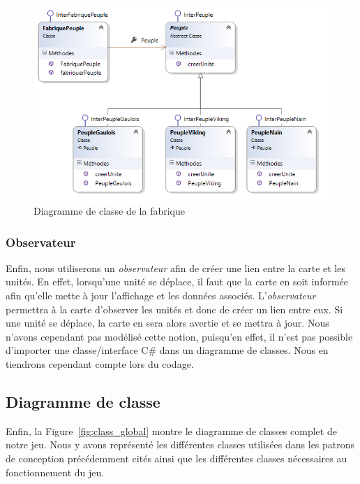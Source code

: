 \documentclass[a4paper]{article}%
\begin{document}
\begin{figure}[H]
    \centering
    \includegraphics[width=\textwidth]{./images/classe/fabrique.png}
		\caption{Diagramme de classe de la fabrique}
		\label{fig:class_fabrique}
\end{figure}

\subsubsection{Observateur}
Enfin, nous utiliserons un \textit{observateur} afin de créer une lien entre la carte et les unités. En effet, lorsqu'une unité se déplace, il faut que la carte en soit informée afin qu'elle mette à jour l'affichage et les données associés. 
L'\textit{observateur} permettra à la carte d'observer les unités et donc de créer un lien entre eux. Si une unité se déplace, la carte en sera alors avertie et se mettra à jour. 
Nous n'avons cependant pas modélisé cette notion, puisqu'en effet, il n'est pas possible d'importer une classe/interface C\# dans un diagramme de classes. Nous en tiendrons cependant compte lors du codage.


\subsection{Diagramme de classe}
Enfin, la Figure~\ref{fig:class_global} montre  le diagramme de classes complet de notre jeu. Nous y avons représenté les différentes classes utilisées dans les patrons de conception précédemment cités ainsi que les différentes classes nécessaires au fonctionnement du jeu.
\end{document}
